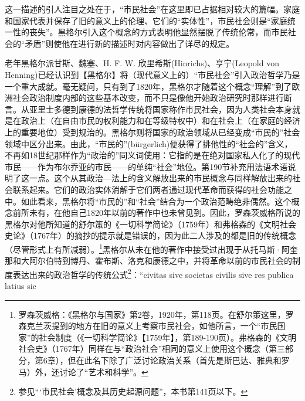这一描述的引人注目之处在于，“市民社会”在这里即已占据相对较大的篇幅。家庭和国家代表并保存了旧的意义上的伦理、它们的“实体性”，市民社会则是“家庭统一性的丧失”。黑格尔引入这个概念的方式表明他显然摆脱了传统伦常，而市民社会的“矛盾”则使他在进行新的描述时对内容做出了详尽的规定。

老年黑格尔派甘斯、魏塞、H. F. W. 欣里希斯(Hinrichs)、亨宁(Leopold von Henning)已经认识到【黑格尔】将（现代意义上的）“市民社会”引入政治哲学乃是一个重大成就。毫无疑问，只有到了1820年，黑格尔才随着这个概念“理解”到了欧洲社会政治制度内部的这些基本改变，而不只是像他开始政治研究时那样进行断言。从亚里士多德到康德的法哲学传统将国家称作市民社会，因为人类社会本身就是在政治上（在自由市民的权利能力和在等级特权中）和在社会上（在家庭的经济上的重要地位）受到规治的。黑格尔则将国家的政治领域从已经变成“市民的”社会领域中区分出来。由此，“市民的”(bürgerlich)便获得了排他性的“社会的”含义，不再如18世纪那样作为“政治的”同义词使用：它指的是在绝对国家私人化了的现代市民——作为布尔乔亚的市民——的单纯“社会”地位。第190节补充用法语术语说明了这一点。这个从其政治—法上的含义解放出来的市民概念与同样解放出来的社会联系起来。它们的政治实体消解于它们两者通过现代革命而获得的社会功能之中。如此看来，黑格尔将“市民的”和“社会”结合为一个政治范畴绝非偶然。这个概念前所未有，在他自己1820年以前的著作中也未曾见到。因此，罗森茨威格所说的黑格尔对他所知道的舒尔策的《一切科学简论》（1759年）和弗格森的《文明社会史论》（1767年）的摘抄的提示就是错误的，因为此二人涉及的都是旧的传统概念（尽管形式上有所减弱）。\footnote{罗森茨威格：《黑格尔与国家》第2卷，1920年，第118页。在舒尔策这里，罗森克兰茨提到的地方在旧的意义上考察市民社会，如他所言，一个“市民国家”的社会制度（《一切科学简论》【1759年】，第189-190页）。弗格森的《文明社会史》（1767年）同样在与“政治社会”相同的意义上使用这个概念（第三部分，第6章），但在此名下除了广泛讨论政治关系（首先是斯巴达、雅典和罗马）外，还讨论了“艺术和科学”。}黑格尔从未在他的著作中接受过出现于从托马斯·阿奎那和大阿尔伯特到博丹、霍布斯、洛克和康德之中，并将革命以前的市民社会的制度表达出来的政治哲学的传统公式\footnote{参见“‘市民社会’概念及其历史起源问题”，本书第141页以下。}：“civitas sive societas civilis sive res publica latius sic 